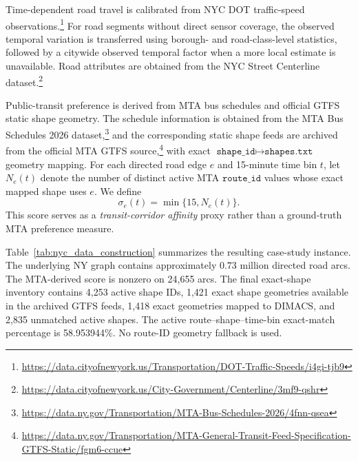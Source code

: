 \documentclass[a4paper,fleqn]{cas-dc}
\begin{document}
Time-dependent road travel is calibrated from NYC DOT traffic-speed
observations.\footnote{\url{https://data.cityofnewyork.us/Transportation/DOT-Traffic-Speeds/i4gi-tjb9}}
For road segments without direct sensor coverage, the observed temporal
variation is transferred using borough- and road-class-level statistics,
followed by a citywide observed temporal factor when a more local estimate is
unavailable. Road attributes are obtained from the NYC Street Centerline
dataset.\footnote{\url{https://data.cityofnewyork.us/City-Government/Centerline/3mf9-qshr}}

Public-transit preference is derived from MTA bus schedules and official GTFS
static shape geometry. The schedule information is obtained from the MTA Bus
Schedules 2026 dataset,\footnote{\url{https://data.ny.gov/Transportation/MTA-Bus-Schedules-2026/4fnn-qsea}}
and the corresponding static shape feeds are archived from the official MTA
GTFS source,\footnote{\url{https://data.ny.gov/Transportation/MTA-General-Transit-Feed-Specification-GTFS-Static/fgm6-ccue}}
with exact \(\texttt{shape\_id}\mapsto\texttt{shapes.txt}\) geometry mapping.
For each directed road edge \(e\) and 15-minute time bin \(t\), let
\(N_e(t)\) denote the number of distinct active MTA \(\texttt{route\_id}\)
values whose exact mapped shape uses \(e\). We define
\[
\sigma_e(t)=\min\{15,N_e(t)\}.
\]
This score serves as a \emph{transit-corridor affinity} proxy rather than a
ground-truth MTA preference measure.

Table~\ref{tab:nyc_data_construction} summarizes the resulting case-study
instance. The underlying NY graph contains approximately \(0.73\) million
directed road arcs. The MTA-derived score is nonzero on 24,655 arcs. The final
exact-shape inventory contains 4,253 active shape IDs, 1,421 exact shape
geometries available in the archived GTFS feeds, 1,418 exact geometries
mapped to DIMACS, and 2,835 unmatched active shapes. The active
route--shape--time-bin exact-match percentage is 58.953944\%. No route-ID
geometry fallback is used.
\end{document}
